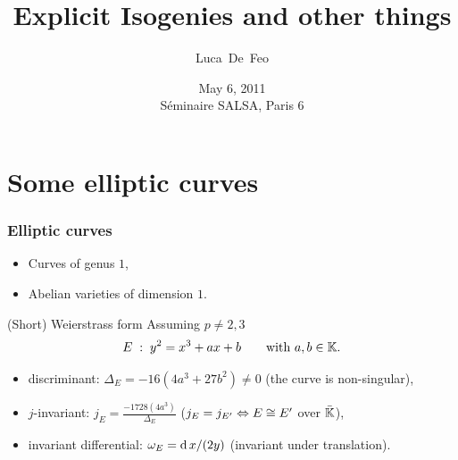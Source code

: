 \documentclass[10pt]{beamer}
\title{Explicit Isogenies and other things}
\author{Luca~De~Feo}
\institute[IRMAR]{IRMAR, Université de Rennes 1}
\date[May 6, 2011]{May 6, 2011\\Séminaire SALSA, Paris 6}
\begin{document}
\begin{frame}
  \titlepage
\end{frame}


\section{Some elliptic curves}

\begin{frame}
  \frametitle{Elliptic curves}

  \begin{itemize}
  \item Curves of genus $1$,
  \item Abelian varieties of dimension $1$.
  \end{itemize}
  
  \begin{block}{(Short) Weierstrass form}
    Assuming $p\ne2,3$
    {\large
      \begin{equation*}
        E\;:\;y^2 = x^3 + ax + b\qquad\text{with $a,b\in\mathbb{K}$.}
      \end{equation*}
    }
    \begin{itemize}
    \item discriminant: \alert{$\Delta_E = -16(4a^3 + 27b^2) \ne 0$} (the curve is non-singular),
    \item $j$-invariant: \alert{$j_E=\frac{-1728(4a^3)}{\Delta_E}$}
      ($j_E=j_{E'} \Leftrightarrow E\cong E'$ over $\bar{\mathbb{K}}$),
    \item invariant differential: \alert{$\omega_E= \operatorname{d} x/(2y)$} (invariant under translation).
    \end{itemize}
  \end{block}
\end{frame}


\end{document}
